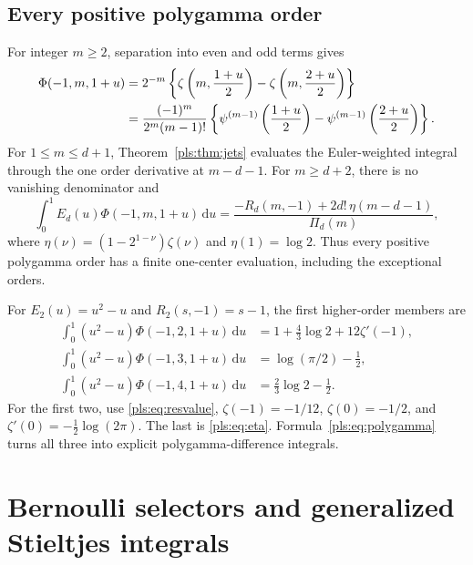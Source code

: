 \documentclass[11pt,letterpaper]{article}
\numberwithin{equation}{section}
\theoremstyle{definition}
\theoremstyle{remark}\newtheorem{remark}[theorem]{Remark}
\newcommand{\dd}{\,\mathrm d}
\begin{document}
\subsection{Every positive polygamma order}

For integer $m\ge2$, separation into even and odd terms gives
\begin{align}
 \Phi(-1,m,1+u)
 &=2^{-m}\left\{\zeta\left(m,\frac{1+u}{2}\right)
                 -\zeta\left(m,\frac{2+u}{2}\right)\right\}\notag\\
 &=\frac{(-1)^m}{2^m(m-1)!}
   \left\{\psi^{(m-1)}\left(\frac{1+u}{2}\right)
         -\psi^{(m-1)}\left(\frac{2+u}{2}\right)\right\}.
\label{pls:eq:polygamma}
\end{align}
For $1\le m\le d+1$, Theorem~\ref{pls:thm:jets} evaluates the
Euler-weighted integral through the one order derivative at $m-d-1$.
For $m\ge d+2$, there is no vanishing denominator and
\begin{equation}\label{pls:eq:eta}
 \int_0^1E_d(u)\Phi(-1,m,1+u)\dd u
       =\frac{-R_d(m,-1)+2d!\,\eta(m-d-1)}{\Pi_d(m)},
\end{equation}
where $\eta(\nu)=(1-2^{1-\nu})\zeta(\nu)$ and
$\eta(1)=\log2$. Thus every positive polygamma order has a finite
one-center evaluation, including the exceptional orders.

For $E_2(u)=u^2-u$ and $R_2(s,-1)=s-1$, the first higher-order
members are
\begin{align}
 \int_0^1(u^2-u)\Phi(-1,2,1+u)\dd u
       &=1+\frac43\log2+12\zeta'(-1),\label{pls:eq:E2m2}\\
 \int_0^1(u^2-u)\Phi(-1,3,1+u)\dd u
       &=\log(\pi/2)-\frac12,\label{pls:eq:E2m3}\\
 \int_0^1(u^2-u)\Phi(-1,4,1+u)\dd u
       &=\frac23\log2-\frac12.\label{pls:eq:E2m4}
\end{align}
For the first two, use \eqref{pls:eq:resvalue},
$\zeta(-1)=-1/12$, $\zeta(0)=-1/2$, and
$\zeta'(0)=-\tfrac12\log(2\pi)$. The last is
\eqref{pls:eq:eta}. Formula~\eqref{pls:eq:polygamma} turns all three
into explicit polygamma-difference integrals.

\section{Bernoulli selectors and generalized Stieltjes integrals}
\label{pls:sec:stieltjes}
\end{document}
